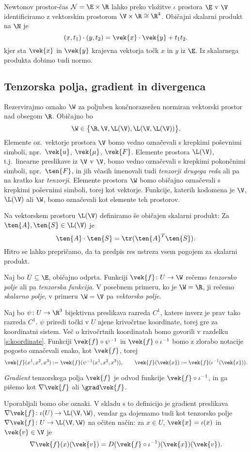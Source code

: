 Newtonov prostor-čas $\mathcal{N}=\E\times\R$ lahko preko vložitve $\iota$ prostora $\E$ v $\V$
identificiramo z vektorskim prostorom $\V\times\R\cong\R^4$. Običajni skalarni produkt na $\N$ je
\[ (x,t_1)\cdot(y,t_2) = \vek{x}\cdot\vek{y} + t_1 t_2. \]
kjer sta $\vek{x}$ in $\vek{y}$ krajevna vektorja točk $x$ in $y$ iz $\E$.
Iz skalarnega produkta dobimo tudi normo.


\subsection{Tenzorska polja, gradient in divergenca}


Rezervirajmo oznako $\W$ za poljuben končnorazsežen normiran vektorski
prostor nad obsegom $\R$. Običajno bo
\[ \W\in\big\{ \R,\V,\L(\V),\L(\V,\L(\V)) \big\}. \]
Elemente oz.~vektorje prostora $\V$ bomo vedno označevali s krepkimi poševni\-mi simboli,
npr.~$\vek{u}$, $\vek{\mu}$, $\vek{F}$. Elemente prostora $\L(\V)$, t.j.~linearne
preslikave iz $\V$ v $\V$, bomo vedno označevali s krepkimi pokončnimi simboli, npr.~$\ten{F}$,
in jih včasih imenovali tudi \emph{tenzorji drugega reda} ali pa na kratko kar \emph{tenzorji}.
Elemente prostora $\W$ bomo običajno označevali s krepkimi poševnimi simboli, torej kot vektorje.
Funkcije, katerih kodomena je $\V$, $\L(\V)$ ali $\W$, bomo označevali kot elemente teh prostorov.

Na vektorskem prostoru $\L(\V)$ definiramo še običajen skalarni produkt: Za $\ten{A},\ten{S}\in\L(\V)$ je
\[ \ten{A}\cdot\ten{S}=\tr(\ten{A}^{T}\ten{S}). \]
Hitro se lahko prepričamo, da ta predpis res ustreza vsem pogojem za skalarni produkt.

Naj bo $U\subseteq\E$, običajno odprta. Funkciji $\vek{f}\colon U\to\W$ rečemo \emph{tenzorsko polje} ali pa
\emph{tenzorska funkcija}. V posebnem primeru, ko je $\W=\R$, ji rečemo \emph{skalarno polje},
v primeru $\W=\V$ pa \emph{vektorsko polje}.

Naj bo $\psi\colon U\to\R^3$ bijektivna preslikava razreda $C^1$, katere inverz je prav tako
razreda $C^1$. $\psi$ priredi točki v $U$ njene krivočrtne koordinate, torej gre za koordinatni sistem.
Več o krivočrtnih koordinatah bomo govorili v razdelku \ref{s:koordinate}.
Funkciji $\vek{f}\circ\psi^{-1}$ in $\vek{f}\circ\iota^{-1}$ bomo z zlorabo notacije pogosto
označevali enako, kot $\vek{f}$, torej
\[
	\vek{f}(x^1,x^2,x^3):=\vek{f}(\psi^{-1}(x^1,x^2,x^3)),\qquad
	\vek{f}(\vek{x}):=\vek{f}(\iota^{-1}(\vek{x})).
\]

\begin{definicija}
	\emph{Gradient} tenzorskega polja $\vek{f}$ je odvod funkcije $\vek{f}\circ\iota^{-1}$,
	in ga pišemo kot $\nabla\vek{f}$ ali $\grad\vek{f}$.
\end{definicija}
Uporabljali bomo obe oznaki. V skladu s to definicijo je gradient preslikava
$\nabla\vek{f}\colon\iota(U)\to\L(\V,\W)$, vendar ga dojemamo tudi kot tenzorsko polje
$\nabla\vek{f}\colon U\to\L(\V,\W)$ na očiten način: za $x\in U$,
$\vek{x}=\iota(x)$ in $\vek{v}\in\V$ je
\[
	\nabla\vek{f}(x)(\vek{v})=D(\vek{f}\circ\iota^{-1})(\vek{x})(\vek{v}).
\]

